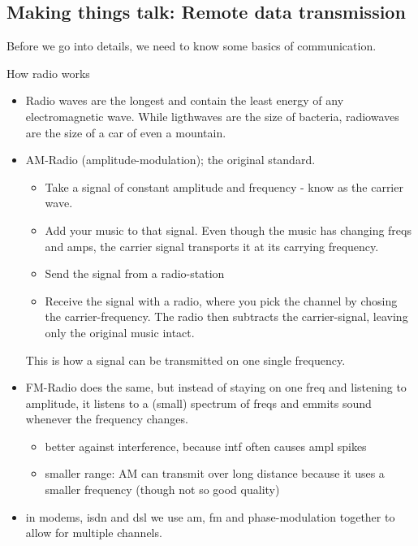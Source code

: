 \subsection{Making things talk: Remote data transmission}

Before we go into details, we need to know some basics of communication.

How radio works
\begin{itemize}
    \item Radio waves are the longest and contain the least energy of any electromagnetic wave. While ligthwaves are the size of bacteria, radiowaves are the size of a car of even a mountain.
    \item AM-Radio (amplitude-modulation); the original standard. 
        \begin{itemize}
            \item Take a signal of constant amplitude and frequency - know as the carrier wave. 
            \item Add your music to that signal. Even though the music has changing freqs and amps, the carrier signal transports it at its carrying frequency.
            \item Send the signal from a radio-station
            \item Receive the signal with a radio, where you pick the channel by chosing the carrier-frequency. The radio then subtracts the carrier-signal, leaving only the original music intact. 
        \end{itemize}
        This is how a signal can be transmitted on one single frequency. 
    \item FM-Radio does the same, but instead of staying on one freq and listening to amplitude, it listens to a (small) spectrum of freqs and emmits sound whenever the frequency changes. 
        \begin{itemize}
            \item better against interference, because intf often causes ampl spikes
            \item smaller range: AM can transmit over long distance because it uses a smaller frequency (though not so good quality)
        \end{itemize}
    \item in modems, isdn and dsl we use am, fm and phase-modulation together to allow for multiple channels. 
\end{itemize}



